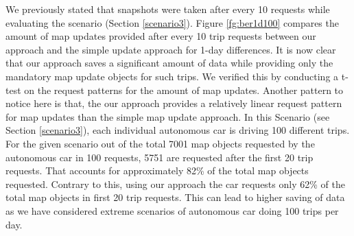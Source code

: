 We previously stated that snapshots were taken after every 10 requests while evaluating the scenario (Section \ref{scenario3}). Figure \ref{fg:ber1d100} compares the amount of map updates provided after every 10 trip requests between our approach and the simple update approach for 1-day differences. It is now clear that our approach saves a significant amount of data while providing only the mandatory map update objects for such trips. We verified this by conducting a t-test on the request patterns for the amount of map updates. Another pattern to notice here is that, the our approach provides a relatively linear request pattern for map updates than the simple map update approach. In this Scenario (see Section \ref{scenario3}), each individual autonomous car is driving 100 different trips. For the given scenario out of the total 7001 map objects requested by the autonomous car in 100 requests, 5751 are requested after the first 20 trip requests. That accounts for approximately 82\% of the total map objects requested. Contrary to this, using our approach the car requests only 62\% of the total map objects in first 20 trip requests. This can lead to higher saving of data as we have considered extreme scenarios of autonomous car doing 100 trips per day. \\

